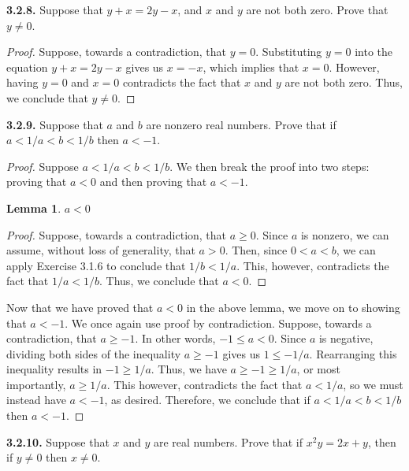 \documentclass[12pt]{amsart}
\newenvironment{statement}[1]{\smallskip\noindent\color[rgb]{.6627, .3529, .6314} {\bf #1.}}{}
\newtheorem{lemma}[theorem]{Lemma}
\theoremstyle{definition}
\theoremstyle{remark}
\begin{document}
\begin{statement}{3.2.8}
Suppose that $y + x = 2y - x$, and $x$ and $y$ are not both zero.
Prove that $y \neq 0$.
\end{statement}

\begin{proof}
Suppose, towards a contradiction, that $y = 0$.
Substituting $y = 0$ into the equation $y + x = 2y - x$ gives us $x = -x$, which implies that $x = 0$.
However, having $y = 0$ and $x = 0$ contradicts the fact that $x$ and $y$ are not both zero.
Thus, we conclude that $y \neq 0$.
\end{proof}


\begin{statement}{3.2.9}
Suppose that $a$ and $b$ are nonzero real numbers.
Prove that if $a < 1/a < b < 1/b$ then $a < -1$.
\end{statement}

\begin{proof}
Suppose $a < 1/a < b < 1/b$.
We then break the proof into two steps: proving that $a < 0$ and then proving that $a < -1$.
	\begin{lemma}
		$a < 0$
	\end{lemma}
	\begin{proof}
	Suppose, towards a contradiction, that $a \geq 0$.
	Since $a$ is nonzero, we can assume, without loss of generality, that $a > 0$.
	Then, since $0 < a < b$, we can apply Exercise 3.1.6 to conclude that $1/b < 1/a$.
	This, however, contradicts the fact that $1/a < 1/b$.
	Thus, we conclude that $a < 0$.
	\end{proof}
Now that we have proved that $a < 0$ in the above lemma, we move on to showing that $a < -1$.
We once again use proof by contradiction.
Suppose, towards a contradiction, that $a \geq -1$.
In other words, $-1 \leq a < 0$.
Since $a$ is negative, dividing both sides of the inequality $a \geq -1$ gives us $1 \leq -1/a$.
Rearranging this inequality results in $-1 \geq 1/a$.
Thus, we have $a \geq -1 \geq 1/a$, or most importantly, $a \geq 1/a$.
This however, contradicts the fact that $a < 1/a$, so we must instead have $a < -1$, as desired.
Therefore, we conclude that if $a < 1/a < b < 1/b$ then $a < -1$.
\end{proof}


\begin{statement}{3.2.10}
Suppose that $x$ and $y$ are real numbers.
Prove that if $x^2y = 2x + y$, then if $y \neq 0$ then $x \neq 0$.
\end{statement}
\end{document}
